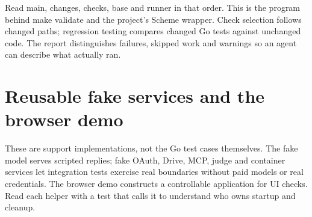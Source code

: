 Read main, changes, checks, base and runner in that order. This is the program behind make validate and the project's Scheme wrapper. Check selection follows changed paths; regression testing compares changed Go tests against unchanged code. The report distinguishes failures, skipped work and warnings so an agent can describe what actually ran.









\chapter{Reusable fake services and the browser demo}

These are support implementations, not the Go test cases themselves. The fake model serves scripted replies; fake OAuth, Drive, MCP, judge and container services let integration tests exercise real boundaries without paid models or real credentials. The browser demo constructs a controllable application for UI checks. Read each helper with a test that calls it to understand who owns startup and cleanup.














